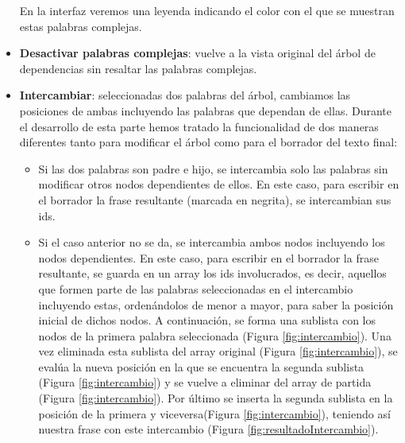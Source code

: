 \begin{itemize}
\begin{itemize}
	\end{itemize}
En la interfaz veremos una leyenda indicando el color con el que se muestran estas palabras complejas.

	\item \textbf{Desactivar palabras complejas}: vuelve a la vista original del árbol de dependencias sin resaltar las palabras complejas. 

   \item \textbf{Intercambiar}: seleccionadas dos palabras del árbol, cambiamos las posiciones de ambas incluyendo las palabras que dependan de ellas.
   Durante el desarrollo de esta parte hemos tratado la funcionalidad de dos maneras diferentes tanto para modificar el árbol como para el borrador del texto final:
\begin{itemize}
   \item Si las dos palabras son padre e hijo, se intercambia solo las palabras sin modificar otros nodos dependientes de ellos. En este caso, para escribir en el borrador la frase resultante (marcada en negrita), se intercambian sus ids. 
   \item Si el caso anterior no se da, se intercambia ambos nodos incluyendo los nodos dependientes. En este caso, para escribir en el borrador la frase resultante, se guarda en un array los ids involucrados, es decir, aquellos que formen parte de las palabras seleccionadas en el intercambio incluyendo estas, ordenándolos de menor a mayor, para saber la posición inicial de dichos nodos. A continuación, se forma una sublista con los nodos de la primera palabra seleccionada (Figura \ref{fig:intercambio}). Una vez eliminada esta sublista del array original (Figura \ref{fig:intercambio}), se evalúa la nueva posición en la que se encuentra la segunda sublista (Figura \ref{fig:intercambio}) y se vuelve a eliminar del array de partida (Figura \ref{fig:intercambio}). Por último se inserta la segunda sublista en la posición de la primera y viceversa(Figura \ref{fig:intercambio}), teniendo así nuestra frase con este intercambio (Figura \ref{fig:resultadoIntercambio}).


\end{itemize}
\end{itemize}
